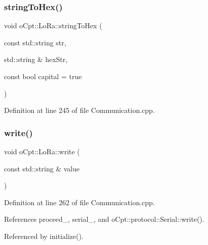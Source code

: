 \hypertarget{classo_cpt_1_1_lo_ra_a3671543fd5f0297ca7e7fb533020bea9}{}\label{classo_cpt_1_1_lo_ra_a3671543fd5f0297ca7e7fb533020bea9} 
\subsubsection{\texorpdfstring{string\+To\+Hex()}{stringToHex()}}
{\footnotesize\ttfamily void o\+Cpt\+::\+Lo\+Ra\+::string\+To\+Hex (\begin{DoxyParamCaption}\item[{const std\+::string}]{str,  }\item[{std\+::string \&}]{hex\+Str,  }\item[{const bool}]{capital = {\ttfamily true} }\end{DoxyParamCaption})\hspace{0.3cm}{\ttfamily [protected]}}



Definition at line 245 of file Communication.\+cpp.

\hypertarget{classo_cpt_1_1_lo_ra_aa96080e6911f8355be8c59da33bfa9d1}{}\label{classo_cpt_1_1_lo_ra_aa96080e6911f8355be8c59da33bfa9d1} 
\subsubsection{\texorpdfstring{write()}{write()}}
{\footnotesize\ttfamily void o\+Cpt\+::\+Lo\+Ra\+::write (\begin{DoxyParamCaption}\item[{const std\+::string \&}]{value }\end{DoxyParamCaption})\hspace{0.3cm}{\ttfamily [protected]}}



Definition at line 262 of file Communication.\+cpp.



References proceed\+\_\+, serial\+\_\+, and o\+Cpt\+::protocol\+::\+Serial\+::write().



Referenced by initialize().

